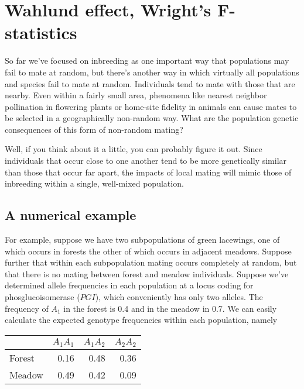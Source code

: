 \chapter{Wahlund effect, Wright's F-statistics}

So far we've focused on inbreeding as one important way that
populations may fail to mate at random, but there's another way in
which virtually all populations and species fail to mate at
random. Individuals tend to mate with those that are nearby. Even
within a fairly small area, phenomena like nearest neighbor
pollination in flowering plants or home-site fidelity in animals can
cause mates to be selected in a geographically non-random way. What
are the population genetic consequences of this form of non-random
mating?

Well, if you think about it a little, you can probably figure it
out. Since individuals that occur close to one another tend to be more
genetically similar than those that occur far apart, the impacts of
local mating will mimic those of inbreeding within a single,
well-mixed population. 

\section*{A numerical example}

For example, suppose we have two subpopulations of green lacewings,
one of which occurs in forests the other of which occurs in adjacent
meadows. Suppose further that within each subpopulation mating occurs
completely at random, but that there is no mating between forest and
meadow individuals. Suppose we've determined allele frequencies in
each population at a locus coding for phosglucoisomerase ($PGI$),
which conveniently has only two alleles. The frequency of $A_1$ in the
forest is 0.4 and in the meadow in 0.7. We can easily calculate the
expected genotype frequencies within each population,
namely

\begin{center}
\begin{tabular}{l|rrr}
\hline\hline
       & $A_1A_1$ & $A_1A_2$ & $A_2A_2$ \\
\hline
Forest &     0.16 &     0.48 &     0.36 \\
Meadow &     0.49 &     0.42 &     0.09 \\
\hline
\end{tabular}
\end{center}

